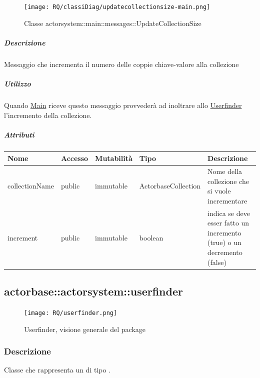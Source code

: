 \documentclass{scalatekids-article}
\begin{document}
\begin{figure}[H]
   \begin{center}
     \texttt{[image: RQ/classiDiag/updatecollectionsize-main.png]}
     \caption{Classe actorsystem::main::messages::UpdateCollectionSize}
   \end{center}
 \end{figure}

\subparagraph{Descrizione}

Messaggio che incrementa il numero delle coppie chiave-valore alla collezione

\subparagraph{Utilizzo}

Quando \hyperref[sec:actorbase::actorsystem::main::Main]{Main}
riceve questo messaggio provvederà ad inoltrare allo \hyperref[sec:actorbase::actorsystem::userfinder::Userfinder]{Userfinder} l'incremento della collezione.

\subparagraph{Attributi}
\begin{tabular}{| p{3cm} | p{1.5cm} | p{2cm} | p{2cm} | p{8.5cm} |}
  \hline
  Nome & Accesso & Mutabilità & Tipo & Descrizione\\
  \hline
  collectionName & public & immutable & ActorbaseCollection & Nome della collezione che si vuole incrementare\\
  \hline
  increment & public & immutable & boolean & indica se deve esser fatto un incremento (true) o un decremento (false)\\
  \hline
\end{tabular}


\subsection{actorbase::actorsystem::userfinder}
\label{sec:actorbase::actorsystem::userfinder}

\begin{figure}[H]
  \begin{center}
    \texttt{[image: RQ/userfinder.png]}
    \caption{Userfinder, visione generale del package}
  \end{center}
\end{figure}

\subsubsection{Descrizione}
Classe che rappresenta un  di tipo .
\end{document}
